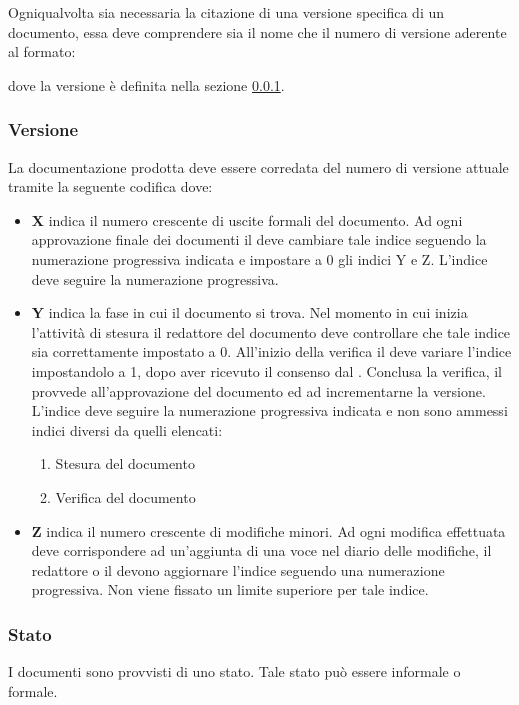 \documentclass[12pt,a4paper]{article}
\begin{document}
Ogniqualvolta sia necessaria la citazione di una versione specifica di un documento, essa deve comprendere sia il nome che il numero di versione aderente al formato:
\begin{center}
\end{center}
dove la versione è definita nella sezione \ref{Versione}.

\subsubsection{Versione} \label{Versione}
La documentazione prodotta deve essere corredata del numero di versione attuale tramite la seguente codifica  dove:
\begin{itemize}
	\item \textbf{X} indica il numero crescente di uscite formali del documento. Ad ogni approvazione finale dei documenti il \PM deve cambiare tale indice seguendo la numerazione progressiva indicata e impostare a 0 gli indici Y e Z. L'indice deve seguire la numerazione progressiva.
	\item \textbf{Y} indica la fase in cui il documento si trova. Nel momento in cui inizia l'attività di stesura il redattore del documento deve controllare che tale indice sia correttamente impostato a 0. All'inizio della verifica il \VR{} deve variare l'indice impostandolo a 1, dopo aver ricevuto il consenso dal \PM. Conclusa la verifica, il \PM{} provvede all'approvazione del documento ed ad incrementarne la versione. L'indice deve seguire la numerazione progressiva indicata e non sono ammessi indici diversi da quelli elencati:
	\begin{enumerate}[start=0]
		\item Stesura del documento
		\item Verifica del documento
	\end{enumerate}
\item \textbf{Z} indica il numero crescente di modifiche minori. Ad ogni modifica effettuata deve corrispondere ad un'aggiunta di una voce nel diario delle modifiche, il redattore o il \VR{} devono aggiornare l'indice seguendo una numerazione progressiva. Non viene fissato un limite superiore per tale indice.
\end{itemize}

\subsubsection{Stato}
I documenti sono provvisti di uno stato. Tale stato può essere informale o formale.
\end{document}
